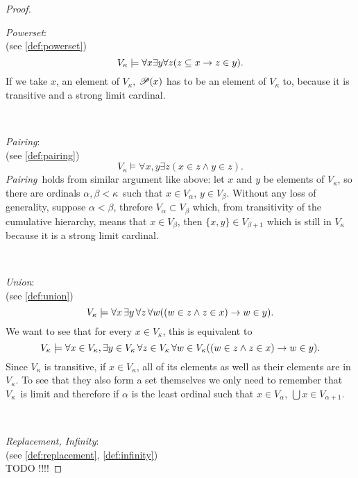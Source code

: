 \begin{proof}
\

\item \emph{Powerset}:\\
(see \ref{def:powerset})
\begin{equation}
V_\kappa \models \forall x \exists y \forall z (z \subseteq x \rightarrow z \in y).
\end{equation}
If we take $x$, an element of $V_\kappa$, $\mathscr{P} (x)$ has to be an element of $V_\kappa$ to, because it is transitive and a strong limit cardinal.

\

\item \emph{Pairing}:\\
(see \ref{def:pairing})
\begin{equation}
V_\kappa \models \forall x, y \exists z (x \in z \land y \in z).
\end{equation}
\emph{Pairing} holds from similar argument like above: let $x$ and $y$ be elements of $V_\kappa$, so there are ordinals $\alpha, \beta < \kappa$ such that $x \in V_\alpha$, $y \in V_\beta$. Without any loss of generality, suppose $\alpha < \beta$, threfore $V_\alpha \subset V_\beta$ which, from transitivity of the cumulative hierarchy, means that $x \in V_\beta$, then $\{x, y\} \in V_{\beta+1}$ which is still in $V_\kappa$ because it is a strong limit cardinal.

\

\item \emph{Union}:\\
(see \ref{def:union})
\begin{equation}
V_\kappa \models \forall x \,\exists y \, \forall z\, \forall w ((w \in z \land z \in x) \rightarrow w \in y).
\end{equation}
We want to see that for every $x \in V_\kappa$, this is equivalent to 
\begin{equation}
V_\kappa \models \forall x \in V_\kappa,\exists y \in V_\kappa\, \forall z \in V_\kappa\, \forall w \in V_\kappa ((w \in z \land z \in x) \rightarrow w \in y).
\end{equation}
Since $V_\kappa$ is transitive, if $x \in V_\kappa$, all of its elements as well as their elements are in $V_\kappa$. To see that they also form a set themselves we only need to remember that $V_\kappa$ is limit and therefore if $\alpha$ is the least ordinal such that $x \in V_\alpha$, $\bigcup x \in V_{\alpha+1}$.

\

\item \emph{Replacement, Infinity}:\\
(see \ref{def:replacement}, \ref{def:infinity})\\
TODO !!!!


\end{proof}
